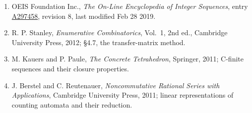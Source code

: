 \documentclass[11pt]{article}
\theoremstyle{definition}
\begin{document}
\begin{enumerate}

\item OEIS Foundation Inc., \emph{The On-Line Encyclopedia of Integer Sequences}, entry \href{https://oeis.org/A297458}{A297458}, revision 8, last modified Feb 28 2019.

\item R. P. Stanley, \emph{Enumerative Combinatorics}, Vol.~1, 2nd ed., Cambridge University Press, 2012; \S4.7, the transfer-matrix method.

\item M. Kauers and P. Paule, \emph{The Concrete Tetrahedron}, Springer, 2011; C-finite sequences and their closure properties.

\item J. Berstel and C. Reutenauer, \emph{Noncommutative Rational Series with Applications}, Cambridge University Press, 2011; linear representations of counting automata and their reduction.

\end{enumerate}
\end{document}
